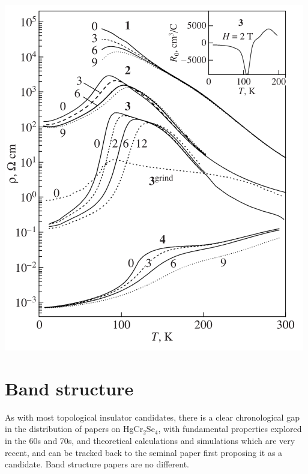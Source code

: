 \documentclass[preprint,pre,floats,aps,amsmath,amssymb]{revtex4}
\begin{document}
\begin{minipage}{.49\linewidth}
\includegraphics[height=1\linewidth]{resvstemp.png}
\centering{}
\end{minipage}


\section{Band structure}

As with most topological insulator candidates, there is a clear chronological gap in the distribution of papers on HgCr$_2$Se$_4$, with fundamental properties explored in the 60s and 70s, and theoretical calculations and simulations which are very recent, and can be tracked back to the seminal paper first proposing it as a candidate. Band structure papers are no different. 
\end{document}
